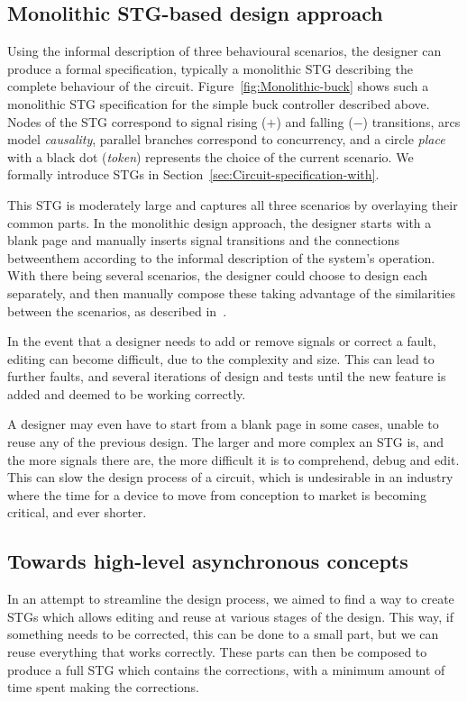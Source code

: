 \documentclass[british, journal]{IEEEtran}
\begin{document}
\subsection{Monolithic STG-based design approach\label{sub:Monolithic}}

Using the informal description of three behavioural scenarios, the designer can
produce a formal specification, typically a monolithic STG describing the
complete behaviour of the circuit. Figure~\ref{fig:Monolithic-buck} shows such
a monolithic STG specification for the simple buck controller described above.
Nodes of the STG correspond to signal rising ($+$) and falling ($-$)
transitions,
arcs model \emph{causality}, parallel branches correspond to concurrency, and
a circle \emph{place} with a black dot (\emph{token}) represents the choice of
the current scenario. We formally introduce STGs
in Section~\ref{sec:Circuit-specification-with}.

This STG is moderately large and captures all three scenarios by overlaying
their common parts. In the monolithic design approach, the designer starts with
a blank page and manually inserts signal transitions and the connections betweenthem according to the informal description of the system's operation. With
there being several scenarios, the designer could choose to design each
separately, and then manually compose these taking advantage of the
similarities between the scenarios, as described
in~\cite{2014_sokolov_ftfc}\cite{sokolov2015design}.

In the event that a designer needs to add or remove signals or correct a fault,
editing can become difficult, due to the complexity and size. This can lead to
further faults, and several iterations of design and tests until the new
feature is added and deemed to be working correctly.

A designer may even have to start from a blank page in some cases, unable to
reuse any of the previous design. The larger and more complex an STG is, and
the more signals there are, the more difficult it is to comprehend,
debug and edit. This can slow the design process of a circuit, which is
undesirable in an industry where the time for a device to move from conception
to market is becoming critical, and ever shorter.

\vspace{-2mm}
\subsection{Towards high-level asynchronous concepts\label{sub:new-way}}
In an attempt to streamline the design process, we aimed to find a way to
create STGs which allows editing and reuse at various stages of the design.
This way, if something needs to be corrected, this can be done to a small part,
but we can reuse everything that works correctly. These parts can then be
composed to produce a full STG which contains the corrections, with a minimum
amount of time spent making the corrections.
\end{document}

